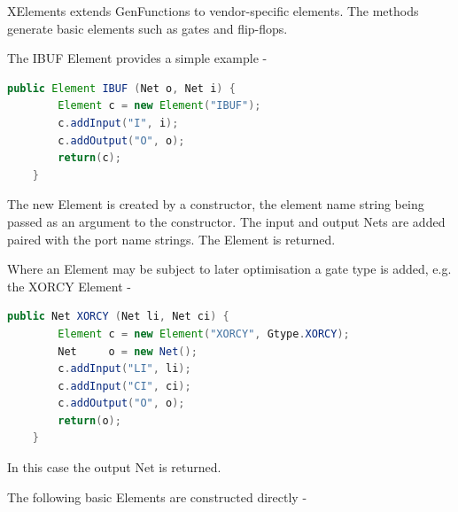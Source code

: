 XElements extends GenFunctions to vendor-specific elements. The methods generate
basic elements such as gates and flip-flops.

The IBUF Element provides a simple example -
\begin{lstlisting}[gobble=0, language=java]
    public Element IBUF (Net o, Net i) {
        Element c = new Element("IBUF");
        c.addInput("I", i);
        c.addOutput("O", o);
        return(c);
    }
\end{lstlisting}
The new Element is created by a constructor, the element name
string being passed as an argument to the constructor. The input
and output Nets are added paired with the port name strings. The
Element is returned.

Where an Element may be subject to later optimisation a gate type
is added, e.g. the XORCY Element -
\begin{lstlisting}[gobble=0, language=java]
    public Net XORCY (Net li, Net ci) {
        Element c = new Element("XORCY", Gtype.XORCY);
        Net     o = new Net();
        c.addInput("LI", li);
        c.addInput("CI", ci);
        c.addOutput("O", o);
        return(o);
    }
\end{lstlisting}
In this case the output Net is returned.

The following basic Elements are constructed directly -

